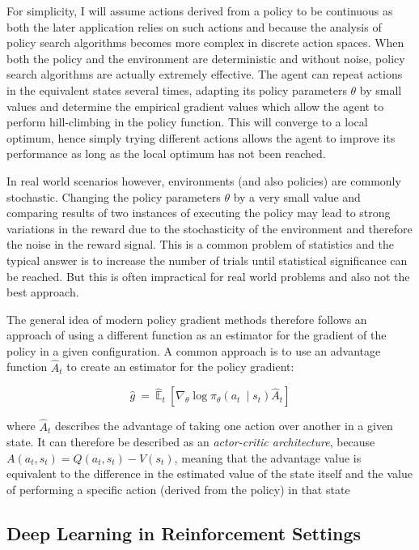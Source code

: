 For simplicity, I will assume actions derived from a policy to be continuous as both the later application relies on
such actions and because the analysis of policy search algorithms becomes more complex in discrete action spaces. When
both the policy and the environment are deterministic and without noise, policy search algorithms are actually extremely
effective. The agent can repeat actions in the equivalent states several times, adapting its policy parameters $\theta$ by
small values and determine the empirical gradient values which allow the agent to perform hill-climbing in the policy
function. This will converge to a local optimum, hence simply trying different actions allows the agent to improve its
performance as long as the local optimum has not been reached. 

In real world scenarios however, environments (and also policies) are commonly stochastic. Changing the policy
parameters $\theta$ by a very small value and comparing results of two instances of executing the policy may lead to
strong variations in the reward due to the stochasticity of the environment and therefore the noise in the reward
signal. This is a common problem of statistics and the typical answer is to increase the number of trials until
statistical significance can be reached. But this is often impractical for real world problems and also not the best
approach. 

The general idea of modern policy gradient methods therefore follows an approach of using a different function as an
estimator for the gradient of the policy in a given configuration. A common approach is to use an advantage function
$\hat{A}_t$ to create an estimator for the policy gradient:


\begin{equation}
\hat{g} \ =\ \hat{\mathbb{E}}_{t} \ \left[ \nabla _{\theta }\log \pi _{\theta }( a_{t} \ \mid s_{t})\hat{A}_{t}  \right]
\end{equation}

where $\hat{A}_t$ describes the advantage of taking one action over another in a given state. It can therefore be
described as an \emph{actor-critic architecture}, because $A(a_t, s_t) = Q(a_t,s_t) - V(s_t)$, meaning that the
advantage value is equivalent to the difference in the estimated value of the state itself and the value of performing
a specific action (derived from the policy) in that state \citep{mnih2016asynchronous} 

\subsection{Deep Learning in Reinforcement Settings}%
\label{sub:deep_learning_in_reinforcement_settings}

